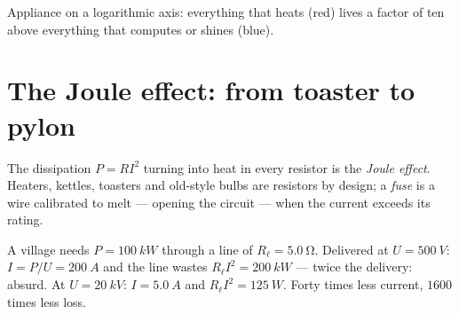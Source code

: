 \begin{omfigure}

{\small Appliance  on a logarithmic axis: everything that heats
(red) lives a factor of ten above everything that computes or shines
(blue).}
\end{omfigure}

\section{The Joule effect: from toaster to pylon}

\begin{definition}\label{def:g11:circuits-and-power:joule}
The dissipation $P = RI^2$ turning  into heat in every
resistor is the \emph{Joule effect}. Heaters,
kettles, toasters and old-style bulbs are resistors by design; a
\emph{fuse} is a  wire calibrated to melt --- opening the
circuit --- when the current exceeds its rating.
\end{definition}

\begin{example}\label{ex:g11:circuits-and-power:transmission}
A village needs $P = \qty{100}{kW}$ through a line of 
$R_\ell = \qty{5.0}{\ohm}$. Delivered at $U = \qty{500}{V}$: $I = P/U =
\qty{200}{A}$ and the line wastes $R_\ell I^2 = \qty{200}{kW}$ --- twice
the delivery: absurd. At $U = \qty{20}{kV}$: $I = \qty{5.0}{A}$ and
$R_\ell I^2 = \qty{125}{W}$. Forty times less current, $1600$ times less
loss.
\end{example}

